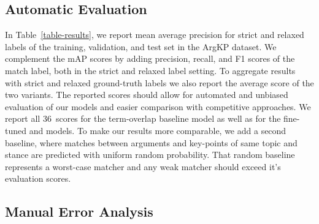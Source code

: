 \subsection{Automatic Evaluation}

In Table~\ref{table-results}, we report mean average precision for strict and relaxed labels of the training, validation, and test set in the ArgKP dataset.
We complement the mAP scores by adding precision, recall, and F1 scores of the match label, both in the strict and relaxed label setting.
To aggregate results with strict and relaxed ground-truth labels we also report the average score of the two variants.
The reported scores should allow for automated and unbiased evaluation of our models and easier comparison with competitive approaches.
We report all 36~scores for the term-overlap baseline model as well as for the fine-tuned \BertBase and \RobertaBase models.
To make our results more comparable, we add a second baseline, where matches between arguments and key-points of same topic and stance are predicted with uniform random probability.
That random baseline represents a worst-case matcher and any weak matcher should exceed it's evaluation scores.


\subsection{Manual Error Analysis}

